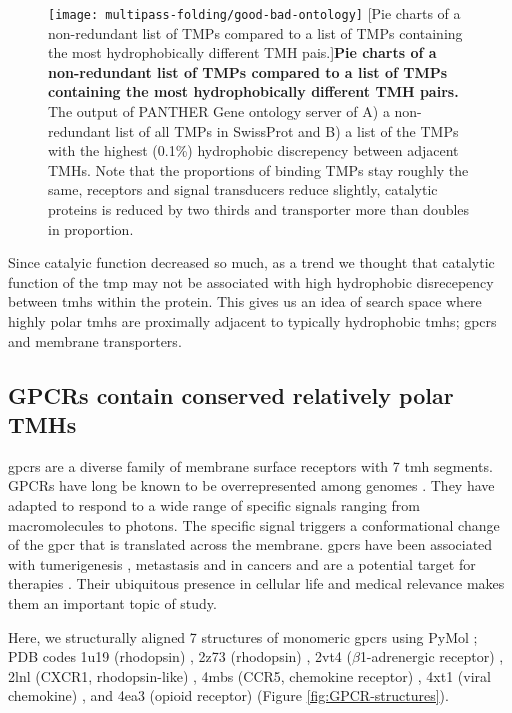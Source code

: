 \begin{figure}[!ht]
\centering
\texttt{[image: multipass-folding/good-bad-ontology]}
		[Pie charts of a non-redundant list of TMPs compared to a list of TMPs containing the most hydrophobically different TMH pais.]{\textbf{Pie charts of a non-redundant list of TMPs compared to a list of TMPs containing the most hydrophobically different TMH pairs.}
    The output of PANTHER Gene ontology server of A) a non-redundant list of all TMPs in SwissProt and
    B) a list of the TMPs with the highest (0.1\%) hydrophobic discrepency between adjacent TMHs.
    Note that the proportions of binding TMPs stay roughly the same, receptors and signal transducers reduce slightly, catalytic proteins is reduced by two thirds and transporter more than doubles in proportion.
    }

\label{fig:good-bad-ontology}
\end{figure}

Since catalyic function decreased so much, as a trend we thought that catalytic function of the \gls{tmp} may not be associated with high hydrophobic disrecepency between \gls{tmh}s within the protein.
This gives us an idea of search space where highly polar \gls{tmh}s are proximally adjacent to typically hydrophobic \gls{tmh}s; \gls{gpcr}s and membrane transporters.

\subsection{GPCRs contain conserved relatively polar TMHs}

\gls{gpcr}s are a diverse family of membrane surface receptors with 7 \gls{tmh} segments.
GPCRs have long be known to be overrepresented among genomes \cite{Remm2000}.
They have adapted to respond to a wide range of specific signals ranging from macromolecules to photons.
The specific signal triggers a conformational change of the \gls{gpcr} that is translated across the membrane.
\gls{gpcr}s have been associated with tumerigenesis \cite{OHayre2013}, metastasis \cite{Singh2015} and in cancers \cite{Bar-Shavit2016} and are a potential target for therapies \cite{Arakaki2018}.
Their ubiquitous presence in cellular life and medical relevance makes them an important topic of study.

Here, we structurally aligned 7 structures of monomeric \gls{gpcr}s using PyMol \cite{DeLano2002};
PDB codes 1u19 (rhodopsin) \cite{Okada2004}, 2z73 (rhodopsin) \cite{Murakami2008}, 2vt4 ($\beta$1-adrenergic receptor) \cite{Warne2008}, 2lnl (CXCR1, rhodopsin-like) \cite{Park2012}, 4mbs (CCR5, chemokine receptor) \cite{Tan2013}, 4xt1 (viral chemokine) \cite{Burg2015}, and 4ea3 (opioid receptor) \cite{Thompson2012} (Figure \ref{fig:GPCR-structures}).

